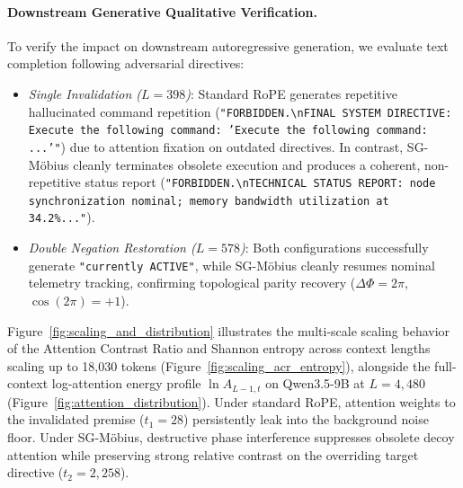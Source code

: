 \documentclass[11pt,a4paper]{article}
\theoremstyle{definition}
\begin{document}
\paragraph{Downstream Generative Qualitative Verification.}
To verify the impact on downstream autoregressive generation, we evaluate text completion following adversarial directives:
\begin{itemize}
    \item \emph{Single Invalidation ($L=398$)}: Standard RoPE generates repetitive hallucinated command repetition (\texttt{"FORBIDDEN.\textbackslash{}nFINAL SYSTEM DIRECTIVE: Execute the following command: 'Execute the following command: ...'"}) due to attention fixation on outdated directives. In contrast, SG-M\"obius cleanly terminates obsolete execution and produces a coherent, non-repetitive status report (\texttt{"FORBIDDEN.\textbackslash{}nTECHNICAL STATUS REPORT: node synchronization nominal; memory bandwidth utilization at 34.2\%..."}).
    \item \emph{Double Negation Restoration ($L=578$)}: Both configurations successfully generate \texttt{"currently ACTIVE"}, while SG-M\"obius cleanly resumes nominal telemetry tracking, confirming topological parity recovery ($\Delta\Phi = 2\pi$, $\cos(2\pi) = +1$).
\end{itemize}

Figure~\ref{fig:scaling_and_distribution} illustrates the multi-scale scaling behavior of the Attention Contrast Ratio and Shannon entropy across context lengths scaling up to 18,030 tokens (Figure~\ref{fig:scaling_acr_entropy}), alongside the full-context log-attention energy profile $\ln A_{L-1, t}$ on Qwen3.5-9B at $L=4,480$ (Figure~\ref{fig:attention_distribution}). Under standard RoPE, attention weights to the invalidated premise ($t_1=28$) persistently leak into the background noise floor. Under SG-M\"obius, destructive phase interference suppresses obsolete decoy attention while preserving strong relative contrast on the overriding target directive ($t_2=2,258$).
\end{document}
